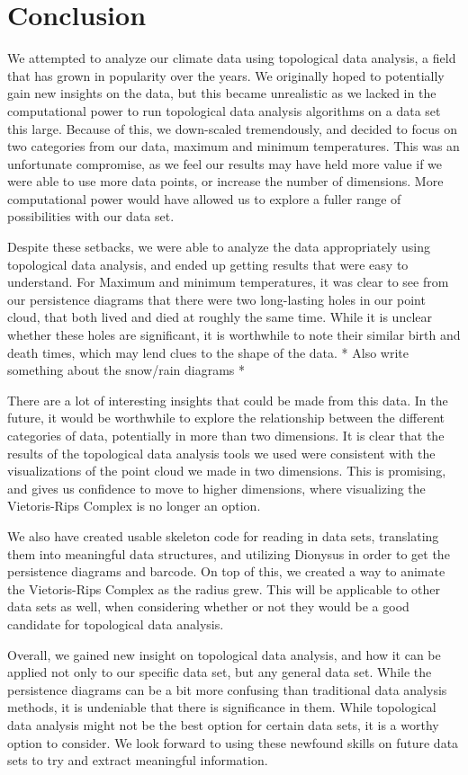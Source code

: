 \documentclass[12pt]{report}
\begin{document}
\section*{Conclusion}
We attempted to analyze our climate data using topological data analysis, a field that has grown in popularity over the years. We originally hoped to potentially gain new insights on the data, but this became unrealistic as we lacked in the computational power to run topological data analysis algorithms on a data set this large. Because of this, we down-scaled tremendously, and decided to focus on two categories from our data, maximum and minimum temperatures. This was an unfortunate compromise, as we feel our results may have held more value if we were able to use more data points, or increase the number of dimensions. More computational power would have allowed us to explore a fuller range of possibilities with our data set.\par
Despite these setbacks, we were able to analyze the data appropriately using topological data analysis, and ended up getting results that were easy to understand. For Maximum and minimum temperatures, it was clear to see from our persistence diagrams that there were two long-lasting holes in our point cloud, that both lived and died at roughly the same time. While it is unclear whether these holes are significant, it is worthwhile to note their similar birth and death times, which may lend clues to the shape of the data. * Also write something about the snow/rain diagrams *\par
There are a lot of interesting insights that could be made from this data. In the future, it would be worthwhile to explore the relationship between the different categories of data, potentially in more than two dimensions. It is clear that the results of the topological data analysis tools we used were consistent with the visualizations of the point cloud we made in two dimensions. This is promising, and gives us confidence to move to higher dimensions, where visualizing the Vietoris-Rips Complex is no longer an option.\par
We also have created usable skeleton code for reading in data sets, translating them into meaningful data structures, and utilizing Dionysus in order to get the persistence diagrams and barcode. On top of this, we created a way to animate the Vietoris-Rips Complex as the radius grew. This will be applicable to other data sets as well, when considering whether or not they would be a good candidate for topological data analysis.\par
Overall, we gained new insight on topological data analysis, and how it can be applied not only to our specific data set, but any general data set. While the persistence diagrams can be a bit more confusing than traditional data analysis methods, it is undeniable that there is significance in them. While topological data analysis might not be the best option for certain data sets, it is a worthy option to consider. We look forward to using these newfound skills on future data sets to try and extract meaningful information.\par
\clearpage
\end{document}
